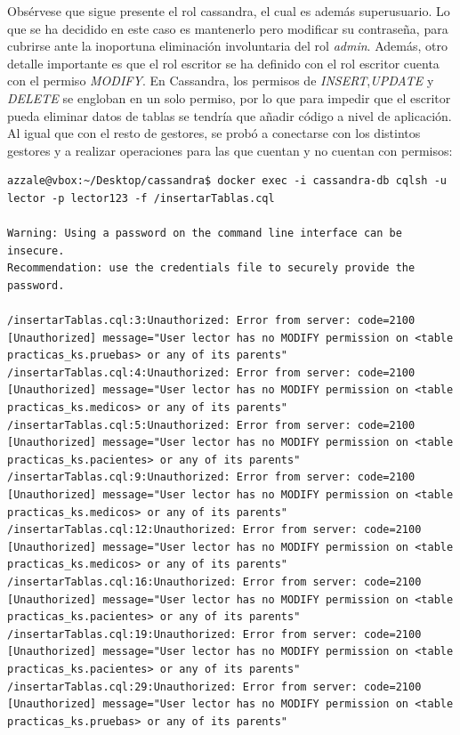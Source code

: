 \documentclass{article}
\begin{document}
Obsérvese que sigue presente el rol cassandra, el cual es además superusuario. Lo que se ha decidido en este caso es mantenerlo pero modificar su contraseña, para cubrirse ante la inoportuna eliminación involuntaria del rol \textit{admin}. Además, otro detalle importante es que el rol escritor se ha definido con el rol escritor cuenta con el permiso \textit{MODIFY}. En Cassandra, los permisos de \textit{INSERT},\textit{UPDATE} y \textit{DELETE} se engloban en un solo permiso, por lo que para impedir que el escritor pueda eliminar datos de tablas se tendría que añadir código a nivel de aplicación.
\\
Al igual que con el resto de gestores, se probó a conectarse con los distintos gestores y a realizar operaciones para las que cuentan y no cuentan con permisos:

\begin{tcolorbox}[colback=black, coltext=white, fontupper=\ttfamily, title=Terminal]
\begin{verbatim}
azzale@vbox:~/Desktop/cassandra$ docker exec -i cassandra-db cqlsh -u lector -p lector123 -f /insertarTablas.cql

Warning: Using a password on the command line interface can be insecure.
Recommendation: use the credentials file to securely provide the password.

/insertarTablas.cql:3:Unauthorized: Error from server: code=2100 [Unauthorized] message="User lector has no MODIFY permission on <table practicas_ks.pruebas> or any of its parents"
/insertarTablas.cql:4:Unauthorized: Error from server: code=2100 [Unauthorized] message="User lector has no MODIFY permission on <table practicas_ks.medicos> or any of its parents"
/insertarTablas.cql:5:Unauthorized: Error from server: code=2100 [Unauthorized] message="User lector has no MODIFY permission on <table practicas_ks.pacientes> or any of its parents"
/insertarTablas.cql:9:Unauthorized: Error from server: code=2100 [Unauthorized] message="User lector has no MODIFY permission on <table practicas_ks.medicos> or any of its parents"
/insertarTablas.cql:12:Unauthorized: Error from server: code=2100 [Unauthorized] message="User lector has no MODIFY permission on <table practicas_ks.medicos> or any of its parents"
/insertarTablas.cql:16:Unauthorized: Error from server: code=2100 [Unauthorized] message="User lector has no MODIFY permission on <table practicas_ks.pacientes> or any of its parents"
/insertarTablas.cql:19:Unauthorized: Error from server: code=2100 [Unauthorized] message="User lector has no MODIFY permission on <table practicas_ks.pacientes> or any of its parents"
/insertarTablas.cql:29:Unauthorized: Error from server: code=2100 [Unauthorized] message="User lector has no MODIFY permission on <table practicas_ks.pruebas> or any of its parents"

\end{verbatim}
\end{tcolorbox}
\end{document}
